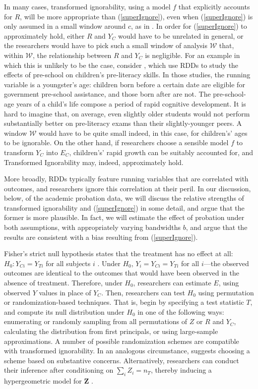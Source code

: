 \documentclass[12pt]{article}
\newcommand{\ych}{E}
\begin{document}
In many cases, transformed ignorability, using a model $f$ that explicitly accounts for $R$, will be more appropriate than (\ref{superIgnore}), even when (\ref{superIgnore}) is only assumed in a small window around $c$, as in \citet{rocio}.
In order for (\ref{superIgnore}) to approximately hold, either $R$ and $Y_C$ would have to be unrelated in general, or the researchers would have to pick such a small window of analysis $\mathcal{W}$ that, within $\mathcal{W}$, the relationship between $R$ and $Y_C$ is negligible.
For an example in which this is unlikely to be the case, consider \citet{wong2007effectiveness}, which use RDDs to study the effects of pre-school on children's pre-literacy skills.
In those studies, the running variable is a youngster's age: children born before a certain date are eligible for government pre-school assistance, and those born after are not.
The pre-school-age years of a child's life compose a period of rapid cognitive development.
It is hard to imagine that, on average, even slightly older students would not perform substantially better on pre-literacy exams than their slightly-younger peers.
A window $\mathcal{W}$ would have to be quite small indeed, in this case, for children's' ages to be ignorable.
On the other hand, if researchers choose a sensible model $f$ to transform $Y_C$ into $\ych_C$, children's' rapid growth can be suitably accounted for, and Transformed Ignorability may, indeed, approximately hold.

More broadly, RDDs typically feature running variables that are correlated with outcomes, and researchers ignore this correlation at their peril.
In our discussion, below, of the academic probation data, we will discuss the relative strengths of transformed ignorability
and (\ref{superIgnore}) in some detail, and argue that the former is more plausible.
In fact, we will estimate the effect of probation under both assumptions, with appropriately varying bandwidths $b$, and argue that the results are consistent with a bias resulting from (\ref{superIgnore}).

Fisher's strict null hypothesis states that the treatment has no
effect at all: $H_0: Y_{Ci}=Y_{Ti}$ for all subjects $i$
\citep{fisher:1935,rosenbaum:2002}.
Under $H_0$, $Y_i=Y_{Ci}=Y_{Ti}$ for all $i$---the observed outcomes
are identical to the outcomes that would have been observed in the
absence of treatment.
Therefore, under $H_0$, researchers can estimate $\ych$, using
observed $Y$ values in place of $Y_C$.
Then, researchers can test $H_0$ using permutation or randomization-based techniques.
That is, begin by specifying a test statistic $T$, and compute its
null distribution under $H_0$ in one of the following ways:
enumerating or randomly sampling from all permutations of $Z$ or $R$ and
$Y_C$,
calculating the distribution from first principals, or using
large-sample approximations.
A number of possible randomization schemes are compatible with transformed ignorability.
In an analogous circumstance, \citet{rocio} suggests choosing a scheme based on substantive concerns.
Alternatively, researchers can conduct their inference after
conditioning on $\sum_i Z_i=n_T$, thereby inducing a hypergeometric
model for $\bm{Z}$ \citep{rosenbaum2002covariance}.
\end{document}
